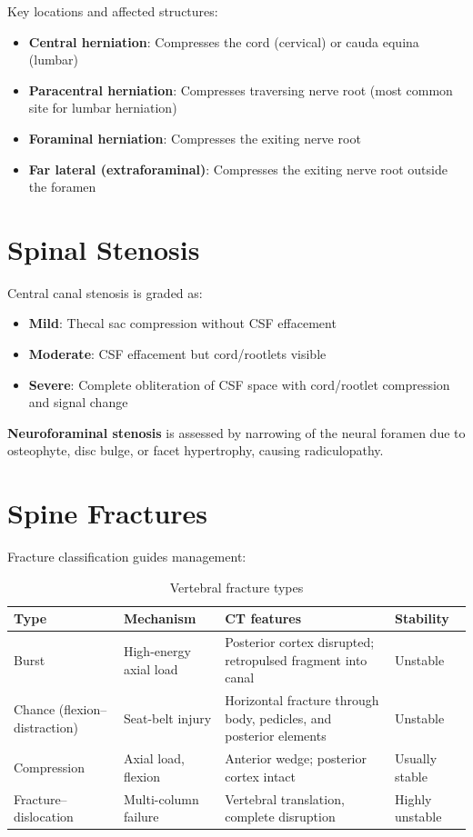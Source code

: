 Key locations and affected structures:
\begin{itemize}
  \item \textbf{Central herniation}: Compresses the cord (cervical) or cauda equina (lumbar)
  \item \textbf{Paracentral herniation}: Compresses traversing nerve root (most common site for lumbar herniation)
  \item \textbf{Foraminal herniation}: Compresses the exiting nerve root
  \item \textbf{Far lateral (extraforaminal)}: Compresses the exiting nerve root outside the foramen
\end{itemize}


\section{Spinal Stenosis}
Central canal stenosis is graded as:
\begin{itemize}
  \item \textbf{Mild}: Thecal sac compression without CSF effacement
  \item \textbf{Moderate}: CSF effacement but cord/rootlets visible
  \item \textbf{Severe}: Complete obliteration of CSF space with cord/rootlet compression and signal change
\end{itemize}

\textbf{Neuroforaminal stenosis} is assessed by narrowing of the neural foramen due to osteophyte, disc bulge, or facet hypertrophy, causing radiculopathy.


\section{Spine Fractures}
Fracture classification guides management:

\begin{table}[h]
\centering
\caption{Vertebral fracture types}
\begin{tabular}{p{2.5cm} p{3cm} p{3.5cm} p{3.5cm}}
\hline
\textbf{Type} & \textbf{Mechanism} & \textbf{CT features} & \textbf{Stability} \\
\hline
Burst & High-energy axial load & Posterior cortex disrupted; retropulsed fragment into canal & Unstable \\
Chance (flexion--distraction) & Seat-belt injury & Horizontal fracture through body, pedicles, and posterior elements & Unstable \\
Compression & Axial load, flexion & Anterior wedge; posterior cortex intact & Usually stable \\
Fracture--dislocation & Multi-column failure & Vertebral translation, complete disruption & Highly unstable \\
\hline
\end{tabular}
\end{table}

